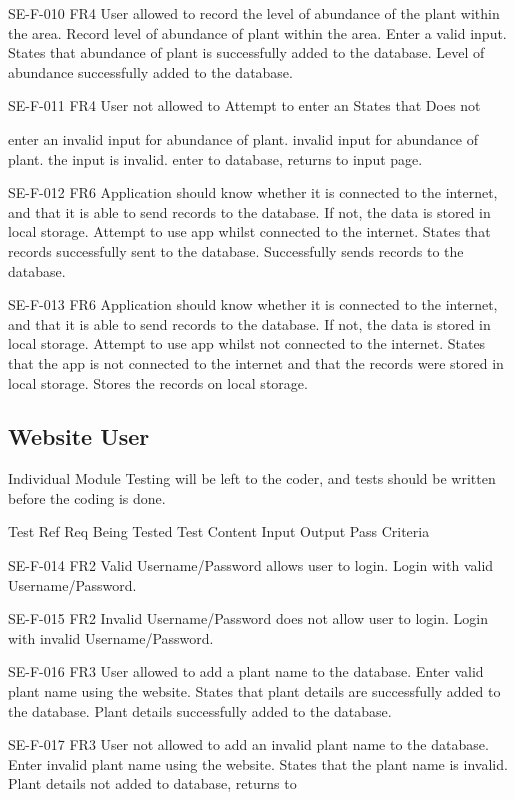 SE-F-010 FR4 User allowed to record the level of abundance of the plant within the area. Record level of abundance of plant within the area. Enter a valid input. States that abundance of plant is successfully added to the database. Level of abundance successfully added to the database.

SE-F-011 FR4 User not allowed to Attempt to enter an States that Does not

enter an invalid input for abundance of plant. invalid input for abundance of plant. the input is invalid. enter to database, returns to input page.

SE-F-012 FR6 Application should know whether it is connected to the internet, and that it is able to send records to the database. If not, the data is stored in local storage. Attempt to use app whilst connected to the internet. States that records successfully sent to the database. Successfully sends records to the database.

SE-F-013 FR6 Application should know whether it is connected to the internet, and that it is able to send records to the database. If not, the data is stored in local storage. Attempt to use app whilst not connected to the internet. States that the app is not connected to the internet and that the records were stored in local storage. Stores the records on local storage.
\subsection{Website User}
Individual Module Testing will be left to the coder, and tests should be written before the coding is done.

Test Ref Req Being Tested Test Content Input Output Pass Criteria

SE-F-014 FR2 Valid Username/Password allows user to login. Login with valid Username/Password.

SE-F-015 FR2 Invalid Username/Password does not allow user to login. Login with invalid Username/Password.

SE-F-016 FR3 User allowed to add a plant name to the database. Enter valid plant name using the website. States that plant details are successfully added to the database. Plant details successfully added to the database.

SE-F-017 FR3 User not allowed to add an invalid plant name to the database. Enter invalid plant name using the website. States that the plant name is invalid. Plant details not added to database, returns to

